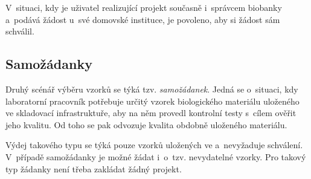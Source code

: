 \documentclass[11pt, draft, oneside]{fithesis2}
\begin{document}
V~situaci, kdy je uživatel realizující projekt současně i~správcem biobanky a~podává žádost u~své domovské instituce, je povoleno, aby si žádost sám schválil.

\subsection{Samožádanky}
Druhý scénář výběru vzorků se týká tzv. \textit{samožádanek}. Jedná se o~situaci, kdy laboratorní pracovník potřebuje určitý vzorek biologického materiálu uloženého ve skladovací infrastruktuře, aby na něm provedl kontrolní testy s~cílem ověřit jeho kvalitu. Od toho se pak odvozuje kvalita obdobně uloženého materiálu. 

Výdej takového typu se týká pouze vzorků uložených ve  a~nevyžaduje schválení. V~případě samožádanky je možné žádat i~o~tzv. nevydatelné vzorky. Pro takový typ žádanky není třeba zakládat žádný projekt.
\end{document}

